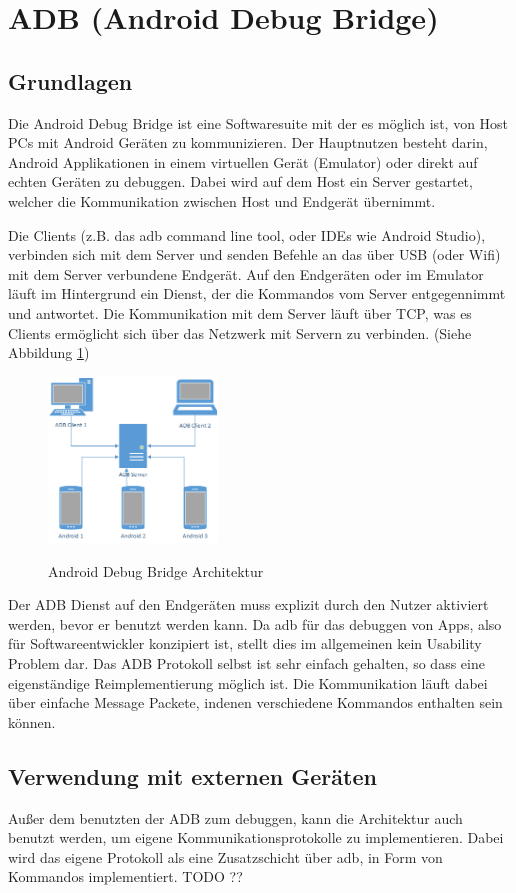 \documentclass[12pt,journal,compsoc]{IEEEtran}
\begin{document}
\section{ADB (Android Debug Bridge)}
\subsection{Grundlagen}
Die Android Debug Bridge ist eine Softwaresuite mit der es möglich ist, von Host PCs mit Android Geräten zu kommunizieren.
Der Hauptnutzen besteht darin, Android Applikationen in einem virtuellen Gerät (Emulator) oder direkt auf echten Geräten zu debuggen.
Dabei wird auf dem Host ein Server gestartet, welcher die Kommunikation zwischen Host und Endgerät übernimmt. 

Die Clients (z.B. das adb command line tool, oder IDEs wie Android Studio), verbinden sich mit dem Server und senden Befehle an das über USB (oder Wifi) mit dem Server verbundene Endgerät.
Auf den Endgeräten oder im Emulator läuft im Hintergrund ein Dienst, der die Kommandos vom Server entgegennimmt und antwortet. Die Kommunikation mit dem Server läuft über TCP,
was es Clients ermöglicht sich über das Netzwerk mit Servern zu verbinden. (Siehe Abbildung \ref{adb})
\begin{figure}
	\centering
	\caption{Android Debug Bridge Architektur}
	\includegraphics[width=0.4\textwidth]{media/adb.png}	
	\label{adb}
\end{figure}

Der ADB Dienst auf den Endgeräten muss explizit durch den Nutzer aktiviert werden, bevor er benutzt werden kann.
Da adb für das debuggen von Apps, also für Softwareentwickler konzipiert ist, stellt dies im allgemeinen kein Usability Problem dar. 
Das ADB Protokoll selbst ist sehr einfach gehalten, so dass eine eigenständige Reimplementierung möglich ist.
Die Kommunikation läuft dabei über einfache Message Packete, indenen verschiedene Kommandos enthalten sein können.


\subsection{Verwendung mit externen Geräten}
Außer dem benutzten der ADB zum debuggen, kann die Architektur auch benutzt werden, um eigene Kommunikationsprotokolle zu implementieren.
Dabei wird das eigene Protokoll als eine Zusatzschicht über adb, in Form von Kommandos implementiert. TODO ??
\end{document}
